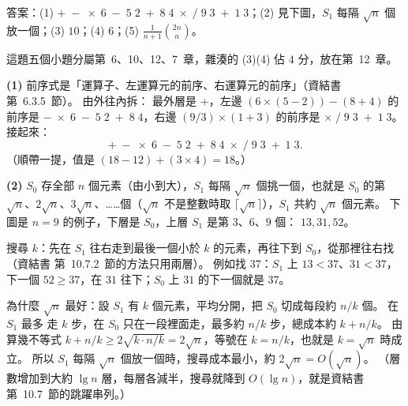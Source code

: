 \begin{pastsoln}
答案：(1) $+\;-\;\times\;6\;-\;5\;2\;+\;8\;4\;\times\;/\;9\;3\;+\;1\;3$；(2) 見下圖，$S_1$ 每隔
$\sqrt n$ 個放一個；(3) $10$；(4) $6$；(5) $\frac{1}{n+1}\binom{2n}{n}$。

這題五個小題分屬第~6、10、12、7~章，雜湊的 (3)(4) 佔 $4$ 分，放在第~12~章。

\textbf{(1)} 前序式是「運算子、左運算元的前序、右運算元的前序」（資結書第~6.3.5~節）。 由外往內拆：
最外層是 $+$，左邊 $(6 \times (5-2)) - (8+4)$ 的前序是 $-\;\times\;6\;-\;5\;2\;+\;8\;4$，右邊
$(9/3) \times (1+3)$ 的前序是 $\times\;/\;9\;3\;+\;1\;3$。 接起來：
\[
+\;-\;\times\;6\;-\;5\;2\;+\;8\;4\;\times\;/\;9\;3\;+\;1\;3 .
\]
（順帶一提，值是 $(18 - 12) + (3 \times 4) = 18$。）

\textbf{(2)} $S_0$ 存全部 $n$ 個元素（由小到大），$S_1$ 每隔 $\sqrt n$ 個挑一個，也就是 $S_0$ 的第
$\sqrt n$、$2\sqrt n$、$3\sqrt n$、……個（$\sqrt n$ 不是整數時取 $\lceil \sqrt n \rceil$），$S_1$ 共約
$\sqrt n$ 個元素。 下圖是 $n = 9$ 的例子，下層是 $S_0$，上層 $S_1$ 是第 $3$、$6$、$9$ 個：
$13, 31, 52$。
\begin{center}
\end{center}
搜尋 $k$：先在 $S_1$ 往右走到最後一個小於 $k$ 的元素，再往下到 $S_0$，從那裡往右找（資結書
第~10.7.2~節的方法只用兩層）。 例如找 $37$：$S_1$ 上 $13 < 37$、$31 < 37$，下一個 $52 \ge 37$，在
$31$ 往下；$S_0$ 上 $31$ 的下一個就是 $37$。

為什麼 $\sqrt n$ 最好：設 $S_1$ 有 $k$ 個元素，平均分開，把 $S_0$ 切成每段約 $n/k$ 個。 在 $S_1$ 最多
走 $k$ 步，在 $S_0$ 只在一段裡面走，最多約 $n/k$ 步，總成本約 $k + n/k$。 由算幾不等式
$k + n/k \ge 2\sqrt{k \cdot n/k} = 2\sqrt n$，等號在 $k = n/k$，也就是 $k = \sqrt n$ 時成立。 所以
$S_1$ 每隔 $\sqrt n$ 個放一個時，搜尋成本最小，約 $2\sqrt n = O(\sqrt n)$。 （層數增加到大約
$\lg n$ 層，每層各減半，搜尋就降到 $O(\lg n)$，就是資結書第~10.7~節的跳躍串列。）


\end{pastsoln}
